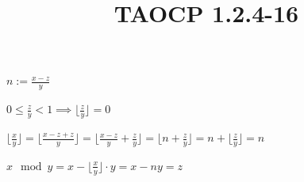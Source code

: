 \documentclass{article}
\title{TAOCP 1.2.4\mbox{-}16}
\begin{document}
\maketitle

\( n := \frac{x-z}{y} \)

\( 0 \leq \frac{z}{y} < 1 \implies \lfloor \frac{z}{y} \rfloor = 0 \)

\( \lfloor\frac{x}{y}\rfloor = \lfloor\frac{x-z+z}{y}\rfloor = \lfloor\frac{x-z}{y} + \frac{z}{y} \rfloor = \lfloor n + \frac{z}{y} \rfloor = n + \lfloor \frac{z}{y} \rfloor = n \)

\( x \mod y = x - \lfloor\frac{x}{y}\rfloor \cdot y = x - ny = z \)
\end{document}
